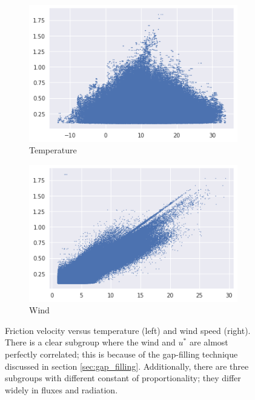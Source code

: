 \documentclass[12pt]{book}
\begin{document}
\begin{figure}
    \centering
    \begin{subfigure}[t]{0.45\textwidth}
        \centering
        \includegraphics[width=\textwidth]{images/ustar_temp}
        \caption{Temperature}
        \label{fig:ustar_temp}
    \end{subfigure}
    \hfill
    \begin{subfigure}[t]{0.45\textwidth}
        \centering
        \includegraphics[width=\textwidth]{images/ustar_wind}
        \caption{Wind}
        \label{fig:ustar_wind}
    \end{subfigure}
    \caption{Friction velocity versus temperature (left) and wind speed (right). There is a clear subgroup where the wind and $u^*$ are almost perfectly correlated; this is because of the gap-filling technique discussed in section \ref{sec:gap_filling}. Additionally, there are three subgroups with different constant of proportionality; they differ widely in fluxes and radiation.}
	\label{fig:ustar_wind_temp}
\end{figure}
\end{document}
